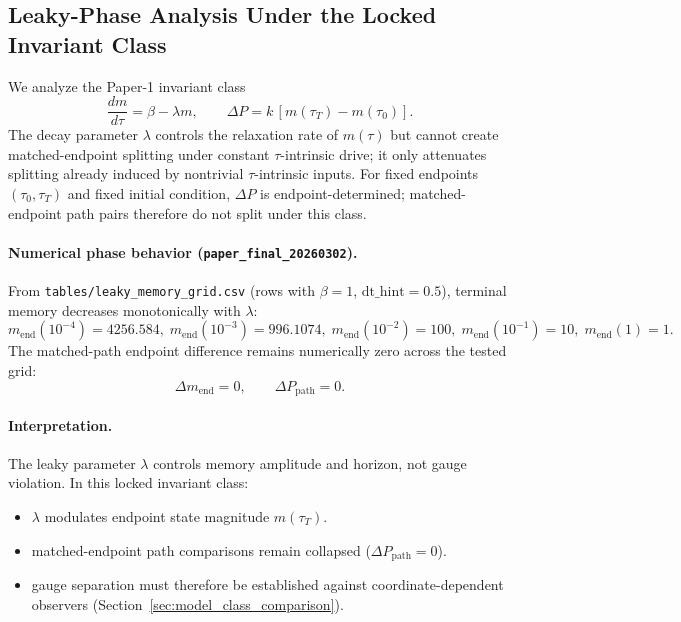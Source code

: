 \subsection{Leaky-Phase Analysis Under the Locked Invariant Class}
\label{sec:leaky_phase_analysis}

We analyze the Paper-1 invariant class
\[
\frac{dm}{d\tau}=\beta-\lambda m,\qquad
\Delta P = k\,[m(\tau_T)-m(\tau_0)].
\]
The decay parameter $\lambda$ controls the relaxation rate of $m(\tau)$ but cannot create matched-endpoint splitting under constant $\tau$-intrinsic drive; it only attenuates splitting already induced by nontrivial $\tau$-intrinsic inputs.
For fixed endpoints $(\tau_0,\tau_T)$ and fixed initial condition, $\Delta P$ is endpoint-determined; matched-endpoint path pairs therefore do not split under this class.

\paragraph{Numerical phase behavior (\texttt{paper\_final\_20260302}).}
From \texttt{tables/leaky\_memory\_grid.csv} (rows with $\beta=1$, $\mathrm{dt\_hint}=0.5$), terminal memory decreases monotonically with $\lambda$:
\[
m_{\text{end}}(10^{-4})=4256.584,\;
m_{\text{end}}(10^{-3})=996.1074,\;
m_{\text{end}}(10^{-2})=100,\;
m_{\text{end}}(10^{-1})=10,\;
m_{\text{end}}(1)=1.
\]
The matched-path endpoint difference remains numerically zero across the tested grid:
\[
\Delta m_{\text{end}}=0,\qquad \Delta P_{\text{path}}=0.
\]

\paragraph{Interpretation.}
The leaky parameter $\lambda$ controls memory amplitude and horizon, not gauge violation. In this locked invariant class:
\begin{itemize}
\item $\lambda$ modulates endpoint state magnitude $m(\tau_T)$.
\item matched-endpoint path comparisons remain collapsed ($\Delta P_{\text{path}}=0$).
\item gauge separation must therefore be established against coordinate-dependent observers (Section~\ref{sec:model_class_comparison}).
\end{itemize}
